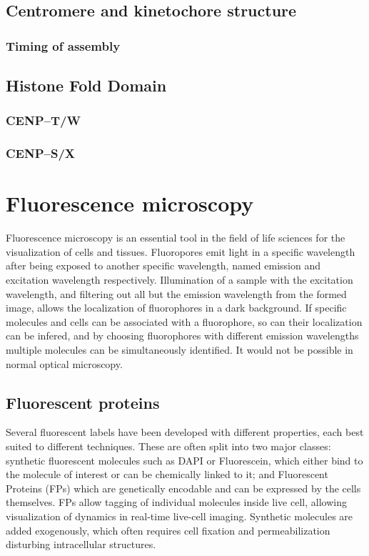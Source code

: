   \subsection{Centromere and kinetochore structure}
    \subsubsection{Timing of assembly}
  \subsection{Histone Fold Domain}
    \subsubsection{CENP--T/W}
    \subsubsection{CENP--S/X}

\section{Fluorescence microscopy}

  Fluorescence microscopy is an essential tool in the field of life
  sciences for the visualization of cells and tissues.
  Fluoropores emit light in a specific wavelength after
  being exposed to another specific wavelength, named
  emission and excitation wavelength respectively.
  Illumination of a sample with the excitation wavelength, and filtering
  out all but the emission wavelength from the formed image, allows
  the localization of fluorophores in a dark background.
  If specific molecules and cells can be associated with a fluorophore,
  so can their localization can be infered, and by choosing fluorophores
  with different emission wavelengths multiple molecules can be
  simultaneously identified.
  It would not be possible in normal optical microscopy.

  \subsection{Fluorescent proteins}
    Several fluorescent labels have been developed with different
    properties, each best suited to different techniques.
    These are often split into two major classes: synthetic fluorescent
    molecules such as DAPI or Fluorescein, which either bind to the molecule of
    interest or can be chemically linked to it; and Fluorescent Proteins (FPs)
    which are genetically encodable and can be expressed by the cells themselves.
    FPs allow tagging of individual molecules inside live cell, allowing
    visualization of dynamics in real-time live-cell imaging.
    Synthetic molecules are added exogenously, which often requires cell
    fixation and permeabilization disturbing intracellular structures.

